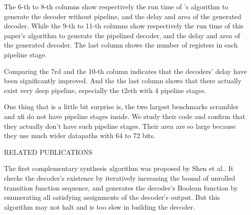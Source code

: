 \documentclass[twocolumn]{article}
\makeatletter
\def\section{\@startsection {section}{1}{\z@}{20pt plus 2pt minus 2pt}
{8pt plus 2pt minus 2pt}{\centering\normalsize\sc
\edef\@svsec{\thesection.\ }}}
\def\thesection{\Roman{section}}
\def\subsection{\@startsection {subsection}{2}{\z@}{16pt plus 2pt minus 2pt}
{6pt plus 2pt minus 2pt}{\normalsize\sl
\edef\@svsec{\thesubsection.\ }}}
\def\thesubsection{\Alph{subsection}}
\makeatother
\begin{document}
The 6-th to 8-th columns show respectively the run time of \cite{ShenTCAD11}'s algorithm to generate the decoder without pipeline,
and the delay and area of the generated decoder.
While the 9-th to 11-th columns show respectively the run time of this paper's algorithm to generate the pipelined decoder,
and the delay and area of the generated decoder.
The last column shows the number of registers in each pipeline stage.

Comparing the 7rd and the 10-th column indicates that
the decoders' delay have been significantly improved.
And the the last column shows that there actually exist very deep pipeline,
especially the t2eth with 4 pipeline stages.

One thing that is a little bit surprise is,
the two largest benchmarks scrambler and xfi do not have pipeline stages inside.
We study their code and confirm that they actually don't have such pipeline stages.
Their area are so large because they use much wider datapaths with 64 to 72 bits.

\section{RELATED PUBLICATIONS}\label{sec_relwork}
%
%

The first complementary synthesis algorithm was proposed by Shen et al.\cite{ShenICCAD09}.
It checks the decoder's existence by iteratively increasing the bound of unrolled transition function sequence,
and generates the decoder's Boolean function by enumerating all satisfying assignments of the decoder's output.
But this algorithm may not halt and is too slow in building the decoder.
\end{document}
